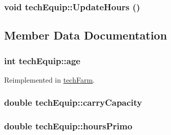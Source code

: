 \label{classtech_equip_a9593d2ee5545ea9157b43f5671c969b3}
\hypertarget{classtech_equip_a8c55f7cfece19df5ab98ee219b3cec0f}{
\subsubsection[{UpdateHours}]{\setlength{\rightskip}{0pt plus 5cm}void techEquip::UpdateHours ()}}
\label{classtech_equip_a8c55f7cfece19df5ab98ee219b3cec0f}


\subsection{Member Data Documentation}
\hypertarget{classtech_equip_abcca018fbc3f7fa3f12258914e1d20f7}{
\subsubsection[{age}]{\setlength{\rightskip}{0pt plus 5cm}int {\bf techEquip::age}}}
\label{classtech_equip_abcca018fbc3f7fa3f12258914e1d20f7}


Reimplemented in \hyperlink{classtech_farm_a938e00cc70834f5115fa1fde901a8ca9}{techFarm}.\hypertarget{classtech_equip_a7abc4270ed1343782440634cc69842fc}{
\subsubsection[{carryCapacity}]{\setlength{\rightskip}{0pt plus 5cm}double {\bf techEquip::carryCapacity}}}
\label{classtech_equip_a7abc4270ed1343782440634cc69842fc}
\hypertarget{classtech_equip_a45958baa672c3b616b5384615e7b3be8}{
\subsubsection[{hoursPrimo}]{\setlength{\rightskip}{0pt plus 5cm}double {\bf techEquip::hoursPrimo}}}
\label{classtech_equip_a45958baa672c3b616b5384615e7b3be8}


